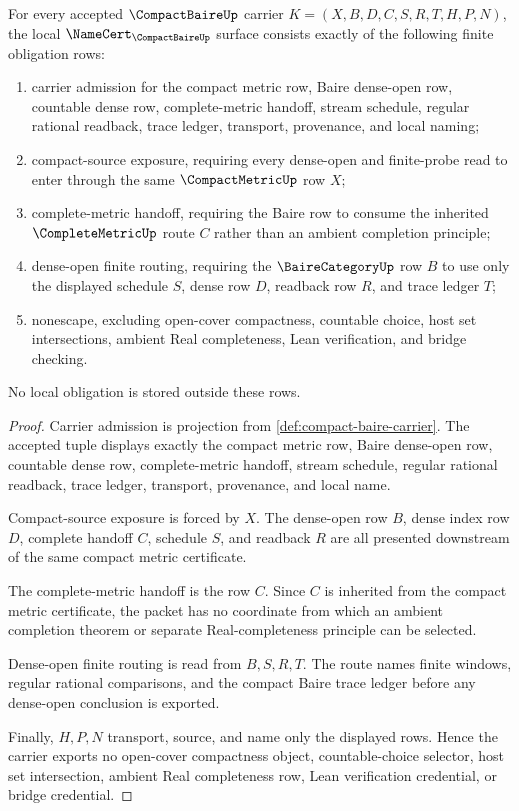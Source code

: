 \begin{theorem}
\label{thm:compact-baire-namecert-obligations}
For every accepted $\CompactBaireUp$ carrier $K=(X,B,D,C,S,R,T,H,P,N)$, the local $\NameCert_{\CompactBaireUp}$ surface consists exactly of the following finite obligation rows:
\begin{enumerate}
\item carrier admission for the compact metric row, Baire dense-open row, countable dense row, complete-metric handoff, stream schedule, regular rational readback, trace ledger, transport, provenance, and local naming;
\item compact-source exposure, requiring every dense-open and finite-probe read to enter through the same $\CompactMetricUp$ row $X$;
\item complete-metric handoff, requiring the Baire row to consume the inherited $\CompleteMetricUp$ route $C$ rather than an ambient completion principle;
\item dense-open finite routing, requiring the $\BaireCategoryUp$ row $B$ to use only the displayed schedule $S$, dense row $D$, readback row $R$, and trace ledger $T$;
\item nonescape, excluding open-cover compactness, countable choice, host set intersections, ambient Real completeness, Lean verification, and bridge checking.
\end{enumerate}
No local obligation is stored outside these rows.
\end{theorem}
\begin{proof}
Carrier admission is projection from \autoref{def:compact-baire-carrier}. The accepted tuple displays exactly the compact metric row, Baire dense-open row, countable dense row, complete-metric handoff, stream schedule, regular rational readback, trace ledger, transport, provenance, and local name.

Compact-source exposure is forced by $X$. The dense-open row $B$, dense index row $D$, complete handoff $C$, schedule $S$, and readback $R$ are all presented downstream of the same compact metric certificate.

The complete-metric handoff is the row $C$. Since $C$ is inherited from the compact metric certificate, the packet has no coordinate from which an ambient completion theorem or separate Real-completeness principle can be selected.

Dense-open finite routing is read from $B,S,R,T$. The route names finite windows, regular rational comparisons, and the compact Baire trace ledger before any dense-open conclusion is exported.

Finally, $H,P,N$ transport, source, and name only the displayed rows. Hence the carrier exports no open-cover compactness object, countable-choice selector, host set intersection, ambient Real completeness row, Lean verification credential, or bridge credential.
\end{proof}

